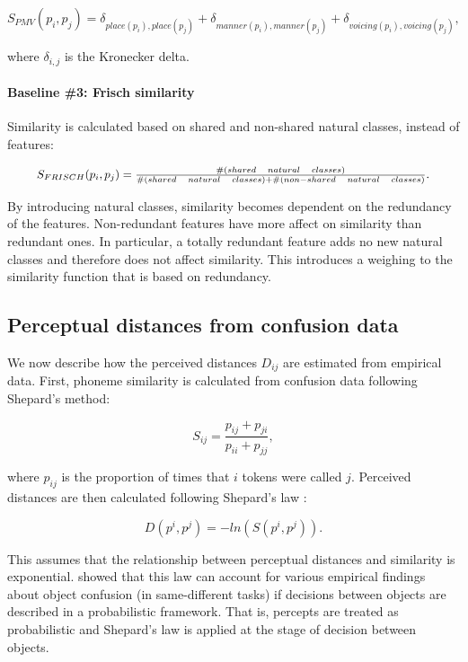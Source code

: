 \begin{equation}
S_{PMV}(p_i, p_j) = \delta_{place(p_i),place(p_j)} + \delta_{manner(p_i),manner(p_j)} + \delta_{voicing(p_i),voicing(p_j)},
\end{equation}

where $\delta_{i,j}$ is the Kronecker delta.

\paragraph{Baseline \#3: Frisch similarity \citep{Frisch1997}} Similarity is calculated based on shared and non-shared natural classes, instead of features:
 
\begin{equation}
\resizebox{.9\hsize}{!}{$S_{FRISCH}(p_i, p_j) = \frac{\#(shared \quad natural \quad classes)}{\#(shared \quad natural \quad classes) + \#(non-shared \quad natural \quad classes)}$}.
\end{equation}

By introducing natural classes, similarity becomes dependent on the redundancy of the features. Non-redundant features have more affect on similarity than redundant ones. In particular, a totally redundant feature adds no new natural classes and therefore does not affect similarity. This introduces a weighing to the similarity function that is based on redundancy. \mbox{} \\

\subsection{Perceptual distances from confusion data}
We now describe how the perceived distances ${D_{ij}}$ are estimated from empirical data. First, phoneme similarity is calculated from confusion data following Shepard's method:

\begin{equation}
    S_{ij}=\frac{p_{ij}+p_{ji}}{p_{ii}+p_{jj}},
\end{equation}

where $p_{ij}$ is the proportion of times that $i$ tokens were called $j$. Perceived distances are then calculated following Shepard's law \citep{Shepard1987, Johnson2004}:

\begin{equation}
    D(p^i, p^j) = -ln(S(p^i, p^j)).
\end{equation}

This assumes that the relationship between perceptual distances and similarity is exponential. \citet{Ennis1988} showed that this law can account for various empirical findings about object confusion (in same-different tasks) if decisions between objects are described in a probabilistic framework. That is, percepts are treated as probabilistic and Shepard's law is applied at the stage of decision between objects.

